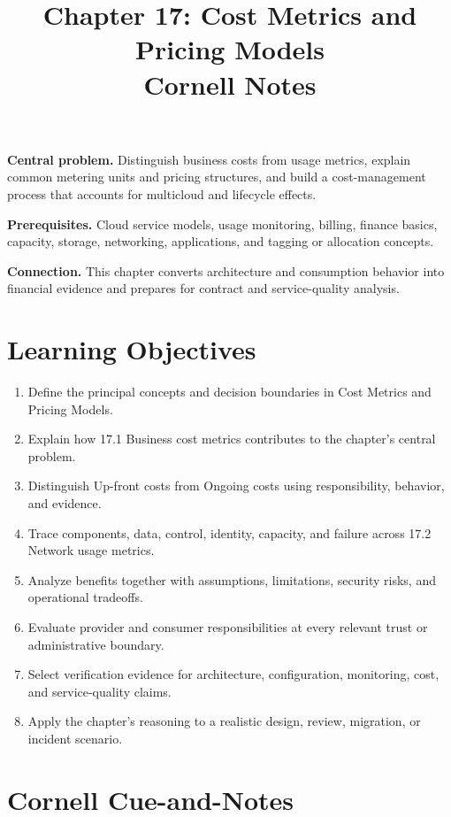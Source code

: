 \documentclass[11pt]{article}
\title{Chapter 17: Cost Metrics and Pricing Models\\[2mm]\large Cornell Notes}
\author{}
\date{}
\begin{document}
\maketitle
\thispagestyle{fancy}
\vspace{-1.5em}
\begin{orientationbox}
\textbf{Central problem.} Distinguish business costs from usage metrics, explain common metering units and pricing structures, and build a cost-management process that accounts for multicloud and lifecycle effects.\par\smallskip
\textbf{Prerequisites.} Cloud service models, usage monitoring, billing, finance basics, capacity, storage, networking, applications, and tagging or allocation concepts.\par\smallskip
\textbf{Connection.} This chapter converts architecture and consumption behavior into financial evidence and prepares for contract and service-quality analysis.
\end{orientationbox}
\section{Learning Objectives}
\begin{enumerate}
\item Define the principal concepts and decision boundaries in Cost Metrics and Pricing Models.
\item Explain how 17.1 Business cost metrics contributes to the chapter's central problem.
\item Distinguish Up-front costs from Ongoing costs using responsibility, behavior, and evidence.
\item Trace components, data, control, identity, capacity, and failure across 17.2 Network usage metrics.
\item Analyze benefits together with assumptions, limitations, security risks, and operational tradeoffs.
\item Evaluate provider and consumer responsibilities at every relevant trust or administrative boundary.
\item Select verification evidence for architecture, configuration, monitoring, cost, and service-quality claims.
\item Apply the chapter's reasoning to a realistic design, review, migration, or incident scenario.
\end{enumerate}
\section{Cornell Cue-and-Notes}
\end{document}
